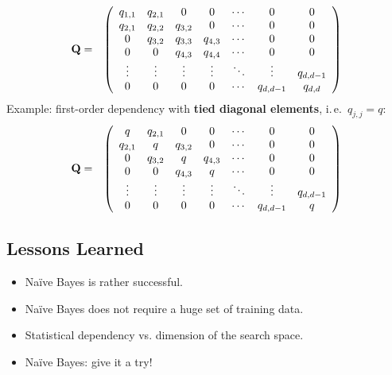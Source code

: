     \begin{eqnarray*}
      \mathbf{Q} &=& \left(
        \begin{array}{ccccccc}
          q_{1,1} & q_{2,1} & 0            & 0            & \cdots & 0              & 0 \\
          q_{2,1} & q_{2,2} & q_{3,2} & 0            & \cdots & 0              & 0 \\
          0            & q_{3,2} & q_{3,3} & q_{4,3} & \cdots & 0              & 0 \\
          0            & 0            & q_{4,3} & q_{4,4} & \cdots & 0              & 0 \\
          \vdots       & \vdots       & \vdots       & \vdots       & \ddots & \vdots         & q_{d,d-1} \\
          0            & 0            & 0            & 0            & \cdots & q_{d,d-1} & q_{d,d} \\
        \end{array}
      \right)
    \end{eqnarray*}
    Example: first-order dependency with \textbf{tied diagonal elements}, i.\,e.\ $q_{j,j}=q$:
      \begin{eqnarray*}
     \mathbf{Q} &=& \left(
       \begin{array}{ccccccc}
         q       & q_{2,1} & 0            & 0            & \cdots & 0              & 0 \\
         q_{2,1} & q       & q_{3,2} & 0            & \cdots & 0              & 0 \\
         0            & q_{3,2} & q       & q_{4,3} & \cdots & 0              & 0 \\
         0            & 0            & q_{4,3} & q       & \cdots & 0              & 0 \\
         \vdots       & \vdots       & \vdots       & \vdots       & \ddots & \vdots         & q_{d,d-1} \\
         0            & 0            & 0            & 0            & \cdots & q_{d,d-1} & q \\
       \end{array}
     \right)
    \end{eqnarray*}
    
    \subsection{Lessons Learned}
\begin{itemize}
    \item Na{\"i}ve Bayes is rather successful. 
    \item Na{\"i}ve Bayes does not require a huge set of training data. 
    \item Statistical dependency vs. dimension of the search space. 
    \item Na{\"i}ve Bayes: give it a try!
  \end{itemize}

